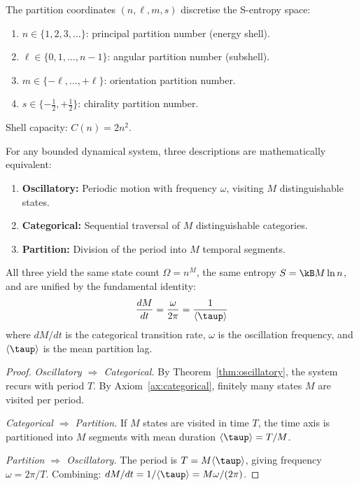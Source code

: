 \begin{definition}
\label{def:partition_coords}
The partition coordinates $(n, \ell, m, s)$ discretise the S-entropy space:
\begin{enumerate}[label=(\roman*)]
    \item $n \in \{1, 2, 3, \ldots\}$: principal partition number (energy shell).
    \item $\ell \in \{0, 1, \ldots, n-1\}$: angular partition number (subshell).
    \item $m \in \{-\ell, \ldots, +\ell\}$: orientation partition number.
    \item $s \in \{-\tfrac{1}{2}, +\tfrac{1}{2}\}$: chirality partition number.
\end{enumerate}
Shell capacity: $C(n) = 2n^2$.
\end{definition}

\begin{theorem}
\label{thm:triple}
For any bounded dynamical system, three descriptions are mathematically equivalent:
\begin{enumerate}
    \item \textbf{Oscillatory:} Periodic motion with frequency $\omega$, visiting $M$ distinguishable states.
    \item \textbf{Categorical:} Sequential traversal of $M$ distinguishable categories.
    \item \textbf{Partition:} Division of the period into $M$ temporal segments.
\end{enumerate}
All three yield the same state count $\Omega = n^M$, the same entropy $S = \kB M \ln n$, and are unified by the fundamental identity:
\begin{equation}
\label{eq:fundamental}
    \frac{dM}{dt} = \frac{\omega}{2\pi} = \frac{1}{\langle\taup\rangle}
\end{equation}
where $dM/dt$ is the categorical transition rate, $\omega$ is the oscillation frequency, and $\langle\taup\rangle$ is the mean partition lag.
\end{theorem}

\begin{proof}
\emph{Oscillatory $\Rightarrow$ Categorical.} By Theorem~\ref{thm:oscillatory}, the system recurs with period $T$. By Axiom~\ref{ax:categorical}, finitely many states $M$ are visited per period.

\emph{Categorical $\Rightarrow$ Partition.} If $M$ states are visited in time $T$, the time axis is partitioned into $M$ segments with mean duration $\langle\taup\rangle = T/M$.

\emph{Partition $\Rightarrow$ Oscillatory.} The period is $T = M\langle\taup\rangle$, giving frequency $\omega = 2\pi/T$. Combining: $dM/dt = 1/\langle\taup\rangle = M\omega/(2\pi)$.
\end{proof}


